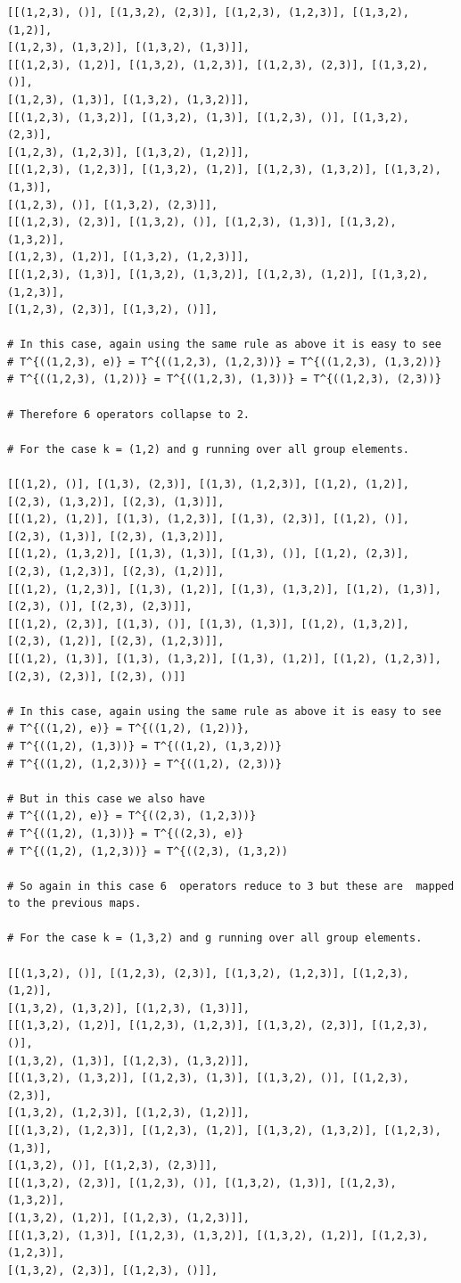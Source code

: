 \begin{lstlisting}[frame=single]
[[(1,2,3), ()], [(1,3,2), (2,3)], [(1,2,3), (1,2,3)], [(1,3,2), (1,2)],
[(1,2,3), (1,3,2)], [(1,3,2), (1,3)]],
[[(1,2,3), (1,2)], [(1,3,2), (1,2,3)], [(1,2,3), (2,3)], [(1,3,2), ()],
[(1,2,3), (1,3)], [(1,3,2), (1,3,2)]],
[[(1,2,3), (1,3,2)], [(1,3,2), (1,3)], [(1,2,3), ()], [(1,3,2), (2,3)],
[(1,2,3), (1,2,3)], [(1,3,2), (1,2)]],
[[(1,2,3), (1,2,3)], [(1,3,2), (1,2)], [(1,2,3), (1,3,2)], [(1,3,2), (1,3)],
[(1,2,3), ()], [(1,3,2), (2,3)]],
[[(1,2,3), (2,3)], [(1,3,2), ()], [(1,2,3), (1,3)], [(1,3,2), (1,3,2)],
[(1,2,3), (1,2)], [(1,3,2), (1,2,3)]],
[[(1,2,3), (1,3)], [(1,3,2), (1,3,2)], [(1,2,3), (1,2)], [(1,3,2), (1,2,3)],
[(1,2,3), (2,3)], [(1,3,2), ()]],

# In this case, again using the same rule as above it is easy to see
# T^{((1,2,3), e)} = T^{((1,2,3), (1,2,3))} = T^{((1,2,3), (1,3,2))}
# T^{((1,2,3), (1,2))} = T^{((1,2,3), (1,3))} = T^{((1,2,3), (2,3))}
  
# Therefore 6 operators collapse to 2.  

# For the case k = (1,2) and g running over all group elements.

[[(1,2), ()], [(1,3), (2,3)], [(1,3), (1,2,3)], [(1,2), (1,2)],
[(2,3), (1,3,2)], [(2,3), (1,3)]],
[[(1,2), (1,2)], [(1,3), (1,2,3)], [(1,3), (2,3)], [(1,2), ()],
[(2,3), (1,3)], [(2,3), (1,3,2)]],
[[(1,2), (1,3,2)], [(1,3), (1,3)], [(1,3), ()], [(1,2), (2,3)],
[(2,3), (1,2,3)], [(2,3), (1,2)]],
[[(1,2), (1,2,3)], [(1,3), (1,2)], [(1,3), (1,3,2)], [(1,2), (1,3)],
[(2,3), ()], [(2,3), (2,3)]],
[[(1,2), (2,3)], [(1,3), ()], [(1,3), (1,3)], [(1,2), (1,3,2)],
[(2,3), (1,2)], [(2,3), (1,2,3)]],
[[(1,2), (1,3)], [(1,3), (1,3,2)], [(1,3), (1,2)], [(1,2), (1,2,3)],
[(2,3), (2,3)], [(2,3), ()]]

# In this case, again using the same rule as above it is easy to see
# T^{((1,2), e)} = T^{((1,2), (1,2))}, 
# T^{((1,2), (1,3))} = T^{((1,2), (1,3,2))} 
# T^{((1,2), (1,2,3))} = T^{((1,2), (2,3))} 

# But in this case we also have 
# T^{((1,2), e)} = T^{((2,3), (1,2,3))}
# T^{((1,2), (1,3))} = T^{((2,3), e)}
# T^{((1,2), (1,2,3))} = T^{((2,3), (1,3,2))

# So again in this case 6  operators reduce to 3 but these are  mapped to the previous maps.

# For the case k = (1,3,2) and g running over all group elements.

[[(1,3,2), ()], [(1,2,3), (2,3)], [(1,3,2), (1,2,3)], [(1,2,3), (1,2)],
[(1,3,2), (1,3,2)], [(1,2,3), (1,3)]],
[[(1,3,2), (1,2)], [(1,2,3), (1,2,3)], [(1,3,2), (2,3)], [(1,2,3), ()],
[(1,3,2), (1,3)], [(1,2,3), (1,3,2)]],
[[(1,3,2), (1,3,2)], [(1,2,3), (1,3)], [(1,3,2), ()], [(1,2,3), (2,3)],
[(1,3,2), (1,2,3)], [(1,2,3), (1,2)]],
[[(1,3,2), (1,2,3)], [(1,2,3), (1,2)], [(1,3,2), (1,3,2)], [(1,2,3), (1,3)],
[(1,3,2), ()], [(1,2,3), (2,3)]],
[[(1,3,2), (2,3)], [(1,2,3), ()], [(1,3,2), (1,3)], [(1,2,3), (1,3,2)],
[(1,3,2), (1,2)], [(1,2,3), (1,2,3)]],
[[(1,3,2), (1,3)], [(1,2,3), (1,3,2)], [(1,3,2), (1,2)], [(1,2,3), (1,2,3)],
[(1,3,2), (2,3)], [(1,2,3), ()]],


\end{lstlisting}
